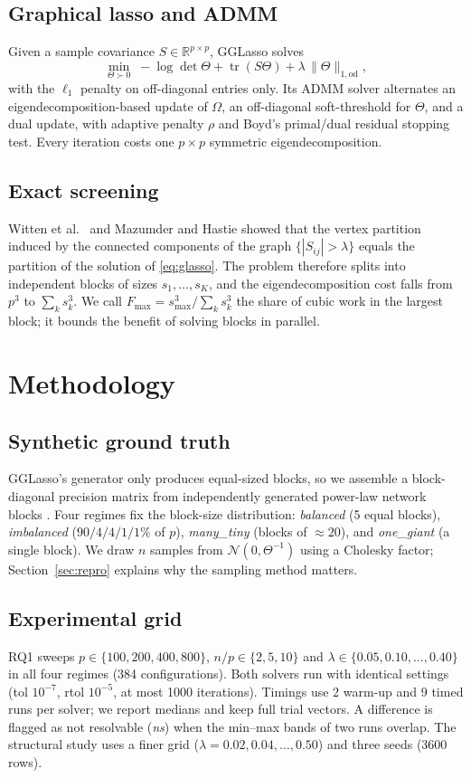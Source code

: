 \documentclass[pdflatex,sn-mathphys-num]{sn-jnl}
\begin{document}
\subsection{Graphical lasso and ADMM}
Given a sample covariance $S\in\mathbb{R}^{p\times p}$, GGLasso solves
\begin{equation}
\min_{\Theta\succ 0}\; -\log\det\Theta + \operatorname{tr}(S\Theta)
+ \lambda\,\lVert\Theta\rVert_{1,\mathrm{od}},
\label{eq:glasso}
\end{equation}
with the $\ell_1$ penalty on off-diagonal entries only. Its ADMM solver
\cite{boyd2011} alternates an eigendecomposition-based update of $\Omega$,
an off-diagonal soft-threshold for $\Theta$, and a dual update, with
adaptive penalty $\rho$ and Boyd's primal/dual residual stopping test.
Every iteration costs one $p\times p$ symmetric eigendecomposition.
\subsection{Exact screening}
Witten et al.\ \cite{witten2011} and Mazumder and Hastie \cite{mazumder2012}
showed that the vertex partition induced by the connected components of the
graph $\{|S_{ij}|>\lambda\}$ equals the partition of the solution of
\eqref{eq:glasso}. The problem therefore splits into independent blocks of
sizes $s_1,\dots,s_K$, and the eigendecomposition cost falls from $p^3$ to
$\sum_k s_k^3$. We call $F_{\max}=s_{\max}^3/\sum_k s_k^3$ the share of cubic
work in the largest block; it bounds the benefit of solving blocks in
parallel.
\section{Methodology}
\subsection{Synthetic ground truth}
GGLasso's generator only produces equal-sized blocks, so we assemble a
block-diagonal precision matrix from independently generated power-law
network blocks \cite{gglasso2021}. Four regimes fix the block-size
distribution: \emph{balanced} (5 equal blocks), \emph{imbalanced}
($90/4/4/1/1\%$ of $p$), \emph{many\_tiny} (blocks of $\approx 20$), and
\emph{one\_giant} (a single block). We draw $n$ samples from
$\mathcal{N}(0,\Theta^{-1})$ using a Cholesky factor; Section~\ref{sec:repro}
explains why the sampling method matters.
\subsection{Experimental grid}
RQ1 sweeps $p\in\{100,200,400,800\}$, $n/p\in\{2,5,10\}$ and
$\lambda\in\{0.05,0.10,\dots,0.40\}$ in all four regimes (384
configurations). Both solvers run with identical settings
(tol $10^{-7}$, rtol $10^{-5}$, at most 1000 iterations). Timings use 2
warm-up and 9 timed runs per solver; we report medians and keep full trial
vectors. A difference is flagged as not resolvable (\emph{ns}) when the
min--max bands of two runs overlap. The structural study uses a finer grid
($\lambda=0.02,0.04,\dots,0.50$) and three seeds (3600 rows).
\end{document}
